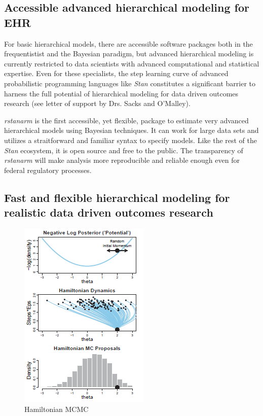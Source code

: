 \documentclass[11pt,notitlepage]{article}
\begin{document}
\subsection*{Accessible advanced hierarchical modeling for EHR}

For basic hierarchical models, there are accessible software 
packages both in the frequentistist and the Bayesian paradigm, but advanced 
hierarchical modeling is currently restricted to data scientists 
with advanced computational and statistical expertise. Even for these specialists, 
the step learning curve of advanced probabilistic programming languages like 
\textit{Stan} constitutes a significant barrier to harness the full potential 
of hierarchical modeling for data driven outcomes research (see letter of support 
by Drs. Sacks and O'Malley).

\textit{rstanarm} is the first accessible, yet flexible, package to estimate
very advanced hierarchical models using Bayesian techniques. It can work for large data 
sets and utilizes a straitforward and familiar syntax to specify models. Like the 
rest of the \textit{Stan} ecosystem, it is open source and free to the public. 
The transparency of \textit{rstanarm} will make analysis more 
reproducible and reliable enough even for federal regulatory processes. 

\subsection*{Fast and flexible hierarchical modeling for realistic data driven outcomes research }

\begin{figure}
  \vspace{-15pt}
 \includegraphics[scale=0.85]{Figures/Hamiltonian.png}
  \vspace{-14pt}
  \caption{Hamiltonian MCMC}
    \label{fig:Hamiltonian}
 \vspace{-16 pt}
\end{figure}
\end{document}
